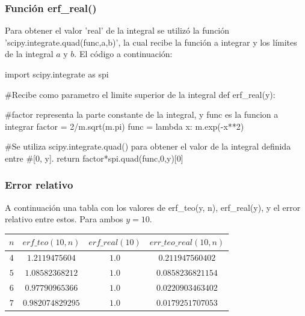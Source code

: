 \documentclass[letter, 10pt]{article}
\begin{document}
\newpage

\subsubsection{Funci\'on erf\_real()} Para obtener el valor 'real' de la integral se utiliz\'o la funci\'on 'scipy.integrate.quad(func,a,b)', la cual recibe la funci\'on a integrar y los l\'imites de la integral $a$ y $b$. El c\'odigo a continuaci\'on:

\begin{python}
import scipy.integrate as spi

#Recibe como parametro el limite superior de la integral
def erf_real(y):

#factor representa la parte constante de la integral, y func es la funcion a integrar
    factor = 2/m.sqrt(m.pi)
    func = lambda x: m.exp(-x**2)

#Se utiliza scipy.integrate.quad() para obtener el valor de la integral definida entre
#[0, y].
    return factor*spi.quad(func,0,y)[0]
\end{python}

\subsubsection{Error relativo} A continuaci\'on una tabla con los valores de erf\_teo(y, n), erf\_real(y), y el error relativo entre estos. Para ambos $y = 10$.\\

\begin{tabular}{|c|c|c|c|}
		\hline
		$n$ & $erf\_teo(10, n)$ & $erf\_real(10)$ & $err\_teo\_real(10, n)$ \\
		\hline \hline
		$ 4 $ & $ 1.2119475604 $ & $ 1.0 $ & $ 0.211947560402 $ \\ 
		$ 5 $ & $ 1.08582368212 $ & $ 1.0 $ & $ 0.0858236821154 $ \\ 
		$ 6 $ & $ 0.97790965366 $ & $ 1.0 $ & $ 0.0220903463402 $ \\ 
		$ 7 $ & $ 0.982074829295 $ & $ 1.0 $ & $ 0.0179251707053 $ \\
		\hline
\end{tabular}

\newpage
\end{document}
